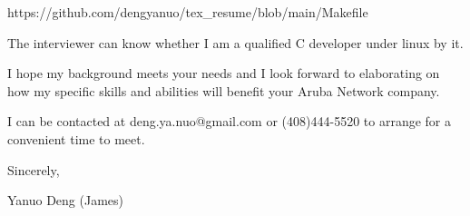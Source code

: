 \centerline{
https://github.com/dengyanuo/tex\_resume/blob/main/Makefile
}

The interviewer can know whether I am a qualified C developer under linux by it.

{ \bigbreak } 
I hope my background meets your needs and I look
forward to elaborating on how my specific skills and abilities will benefit your Aruba Network company.

{ \bigbreak } 
I can be contacted at deng.ya.nuo@gmail.com
or (408)444-5520 to arrange for a convenient time to meet.

{ \bigbreak } 




\vskip 60pt

{ \bigbreak } 
Sincerely,

Yanuo Deng (James)

\bye
